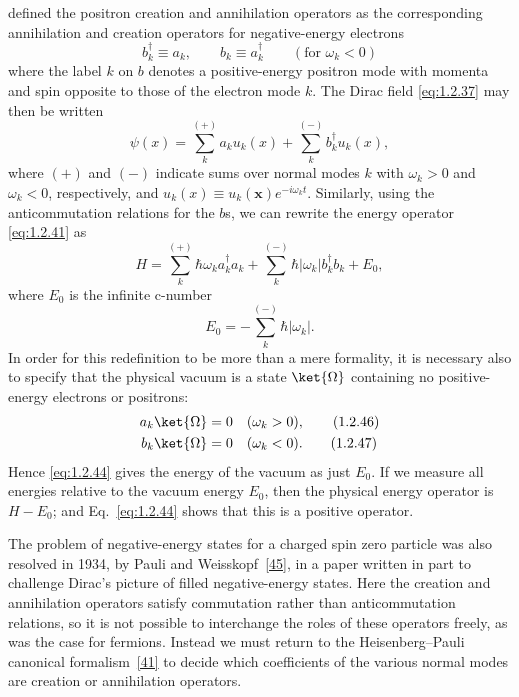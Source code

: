defined the positron creation and annihilation operators as the corresponding
annihilation and creation operators for negative-energy electrons
\begin{equation}
  b_k^{\dagger}\equiv a_k,
  \qquad b_k\equiv a_k^{\dagger}
  \qquad(\text{for }\omega_k<0)
  \tag{1.2.42}\label{eq:1.2.42}
\end{equation}
where the label $k$ on $b$ denotes a positive-energy positron mode with
momenta and spin opposite to those of the electron mode $k$. The Dirac field
\eqref{eq:1.2.37} may then be written
\begin{equation}
  \psi(x)=\sum_k^{(+)}a_ku_k(x)+\sum_k^{(-)}b_k^{\dagger}u_k(x),
  \tag{1.2.43}\label{eq:1.2.43}
\end{equation}
where $(+)$ and $(-)$ indicate sums over normal modes $k$ with $\omega_k>0$
and $\omega_k<0$, respectively, and
$u_k(x)\equiv u_k(\mathbf x)e^{-i\omega_kt}$. Similarly, using the
anticommutation relations for the $b$s, we can rewrite the energy operator
\eqref{eq:1.2.41} as
\begin{equation}
  H=\sum_k^{(+)}\hbar\omega_ka_k^{\dagger}a_k
    +\sum_k^{(-)}\hbar|\omega_k|b_k^{\dagger}b_k+E_0,
  \tag{1.2.44}\label{eq:1.2.44}
\end{equation}
where $E_0$ is the infinite c-number
\begin{equation}
  E_0=-\sum_k^{(-)}\hbar|\omega_k|.
  \tag{1.2.45}\label{eq:1.2.45}
\end{equation}
In order for this redefinition to be more than a mere formality, it is
necessary also to specify that the physical vacuum is a state $\ket{\Omega}$
containing no positive-energy electrons or positrons:
\begin{align}
  a_k\ket{\Omega}&=0 &&(\omega_k>0),
  \tag{1.2.46}\label{eq:1.2.46}\\
  b_k\ket{\Omega}&=0 &&(\omega_k<0).
  \tag{1.2.47}\label{eq:1.2.47}
\end{align}
Hence \eqref{eq:1.2.44} gives the energy of the vacuum as just $E_0$. If we measure
all energies relative to the vacuum energy $E_0$, then the physical energy
operator is $H-E_0$; and Eq.~\eqref{eq:1.2.44} shows that this is a positive operator.

The problem of negative-energy states for a charged spin zero particle was
also resolved in 1934, by Pauli and Weisskopf~\hyperref[ref:1.45]{[45]}, in a paper written in part
to challenge Dirac's picture of filled negative-energy states. Here the
creation and annihilation operators satisfy commutation rather than
anticommutation relations, so it is not possible to interchange the roles of
these operators freely, as was the case for fermions. Instead we must return
to the Heisenberg--Pauli canonical formalism~\hyperref[ref:1.41]{[41]} to decide which coefficients
of the various normal modes are creation or annihilation operators.

